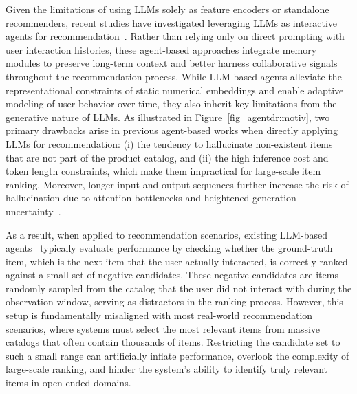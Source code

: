 Given the limitations of using LLMs solely as feature encoders or standalone recommenders, recent studies have investigated leveraging LLMs as interactive agents for recommendation~\cite{agentcf, agent4rec, recagent}. Rather than relying only on direct prompting with user interaction histories, these agent-based approaches integrate memory modules to preserve long-term context and better harness collaborative signals throughout the recommendation process. 
While LLM-based agents alleviate the representational constraints of static numerical embeddings and enable adaptive modeling of user behavior over time, they also inherit key limitations from the generative nature of LLMs. As illustrated in Figure~\ref{fig_agentdr:motiv}, two primary drawbacks arise in previous agent-based works when directly applying LLMs for recommendation: (i) the tendency to hallucinate non-existent items that are not part of the product catalog, and (ii) the high inference cost and token length constraints, which make them impractical for large-scale item ranking. Moreover, longer input and output sequences further increase the risk of hallucination due to attention bottlenecks and heightened generation uncertainty~\cite{hallulength1}.

As a result, when applied to recommendation scenarios, existing LLM-based agents~\cite{agentcf, iagent, agent4rec} typically evaluate performance by checking whether the ground-truth item, which is the next item that the user actually interacted, is correctly ranked against a small set of negative candidates. These negative candidates are items randomly sampled from the catalog that the user did not interact with during the observation window, serving as distractors in the ranking process. However, this setup is fundamentally misaligned with most real-world recommendation scenarios, where systems must select the most relevant items from massive catalogs that often contain thousands of items. Restricting the candidate set to such a small range can artificially inflate performance, overlook the complexity of large-scale ranking, and hinder the system’s ability to identify truly relevant items in open-ended domains.

